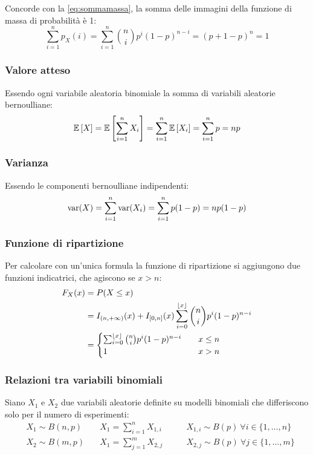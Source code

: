 Concorde con la \eqref{eq:sommamassa}, la somma delle immagini della funzione di massa di probabilità è 1:
\begin{equation*}
	\sum_{i=1}^n p_X(i) = \sum_{i=1}^n \binom{n}{i} p^i(1-p)^{n-i} = (p+1-p)^n = 1
\end{equation*}


\subsubsection{Valore atteso}
Essendo ogni variabile aleatoria binomiale la somma di variabili aleatorie bernoulliane:
\begin{equation}
	\mathbb{E}\left[ X \right] = \mathbb{E}\left[ \sum_{i=1}^n X_i \right] = \sum_{i=1}^n \mathbb{E}\left[ X_i \right] = \sum_{i=1}^n p = np
\end{equation}


\subsubsection{Varianza}
Essendo le componenti bernoulliane indipendenti:
\begin{equation}
	\operatorname{var}(X)=\sum_{i=1}^n \operatorname{var}(X_i) = \sum_{i=1}^n p(1-p) = np(1-p)
\end{equation}


\subsubsection{Funzione di ripartizione}
Per calcolare con un'unica formula la funzione di ripartizione si aggiungono due funzioni indicatrici, che agiscono se $x>n$:
\begin{align}
	F_X(x) & = P(X\leq x)                                                                           \nonumber            \\
	       & = I_{(n,+\infty)}(x) + I_{[0,n]}(x) \sum_{i=0}^{\left\lfloor x \right\rfloor}\binom{n}{i} p^i (1-p)^{n-i} \label{eq:ripabinom} \\
	       & = \begin{cases}
		\sum_{i=0}^{\left\lfloor x \right\rfloor}\binom{n}{i} p^i (1-p)^{n-i}\quad & x\leq n \\
		1                                                       & x>n     \\
	\end{cases} \nonumber
\end{align}

\subsubsection{Relazioni tra variabili binomiali}
Siano $X_1$ e $X_2$ due variabili aleatorie definite su modelli binomiali che differiscono solo per il numero di esperimenti:
\begin{align*}
	 & X_1\sim B(n, p)\quad & X_1=\sum_{i=1}^n X_{1,i}\qquad & X_{1,i}\sim B(p)~\forall i\in\{1,\dots,n\} \\
	 & X_2\sim B(m, p)\quad & X_1=\sum_{j=1}^m X_{2,j}\qquad & X_{2,j}\sim B(p)~\forall j\in\{1,\dots,m\}
\end{align*}

